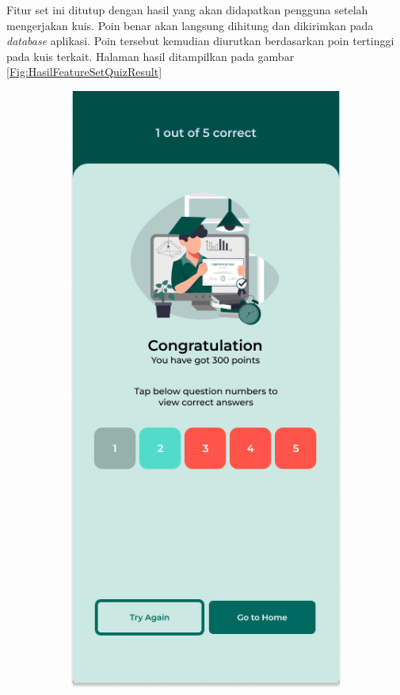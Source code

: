 Fitur set ini ditutup dengan hasil yang akan didapatkan pengguna setelah mengerjakan kuis. Poin benar akan langsung dihitung dan dikirimkan pada \textit{database} aplikasi.
Poin tersebut kemudian diurutkan berdasarkan poin tertinggi pada kuis terkait. Halaman hasil ditampilkan pada gambar \ref*{Fig:HasilFeatureSetQuizResult}
\begin{figure}[H]
	\centering
	\begin{subfigure}[b]{0.23\textwidth}
		\centering
	  \includegraphics[width=\linewidth]{contents/chapter-3/images/HF-result.png}

\end{subfigure}
\end{figure}
